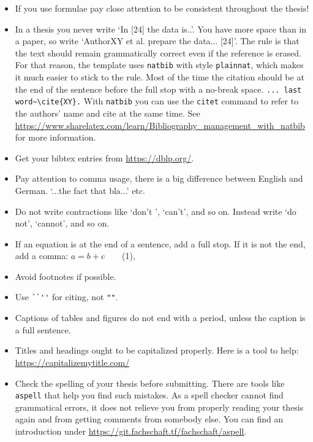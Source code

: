     \begin{itemize}

        \item If you use formulae pay close attention to be consistent throughout the thesis!

        \item In a thesis you never write `In [24] the data is..'. You have more space than in a paper, so write `AuthorXY et al. prepare the data... [24]'. The rule is that the text should remain grammatically correct even if the reference is erased.
          For that reason, the template uses \texttt{natbib} with style \texttt{plainnat}, which makes it much easier to stick to the rule. Most of the time the citation should be at the end of the sentence before the full stop with a no-break space. \verb|... last word~\cite{XY}.| With \texttt{natbib} you can use the \texttt{citet} command to refer to the authors' name and cite at the same time. See \url{https://www.sharelatex.com/learn/Bibliography_management_with_natbib} for more information.
          
        \item Get your bibtex entries from \url{https://dblp.org/}.

        \item Pay attention to comma usage, there is a big difference between English and German. `...the fact that bla...' etc.

        \item Do not write contractions like `don't ', `can't', and so on. Instead write `do not', `cannot', and so on.

        \item If an equation is at the end of a sentence, add a full stop. If it is not the end, add a comma: {$a= b + c$~~~~(1),}

        \item Avoid footnotes if possible.

        \item Use \verb|``''| for citing, not \verb|""|.
        \item Captions of tables and figures do not end with a period, unless the caption is a full sentence.
        \item Titles and headings ought to be capitalized properly. Here is a tool to help: \url{https://capitalizemytitle.com/}

        \item Check the spelling of your thesis before submitting. There are tools like \texttt{aspell} that help you find such mistakes. 
        As a spell checker cannot find grammatical errors, it does not relieve you from properly reading your thesis again and from getting comments from somebody else.
        You can find an introduction under \url{https://git.fachschaft.tf/fachschaft/aspell}.


\end{itemize}
